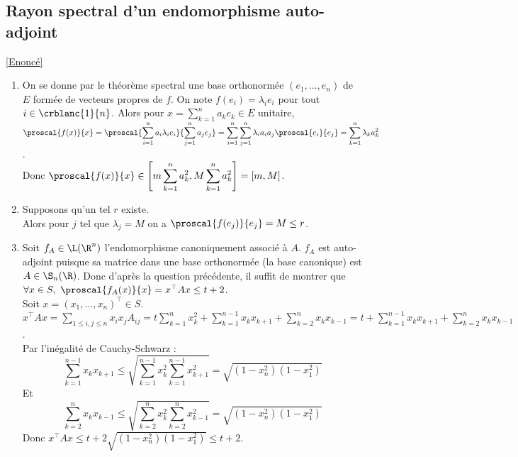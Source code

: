 \documentclass[8pt]{book}
\begin{document}
	\subsection{Rayon spectral d'un endomorphisme auto-adjoint }
	\textcolor{blue}{\hyperref[Rayon spectral d'un endomorphisme auto-adjoint]{[Enoncé]}}\\
	\label{Rayon spectral d'un endomorphisme auto-adjoint corrigé}
	\begin{enumerate}[leftmargin=*]
		\item On se donne par le théorème spectral une base orthonormée $(e_1,\dots,e_n)$ de $E$ formée de vecteurs propres de $f$. On note $f(e_i)=\lambda_ie_i$ pour tout $i\in \crblanc{1}{n}$. Alors pour $x=\displaystyle\sum_{k=1}^na_ke_k\in E$ unitaire,\\
		$\displaystyle\proscal{f(x)}{x}=\proscal{\sum_{i=1}^na_i\lambda_ie_i}{\sum_{j=1}^na_je_j}=\sum_{i=1}^n\sum_{j=1}^n\lambda_ia_ia_j\proscal{e_i}{e_j}=\sum_{k=1}^n\lambda_ka_k^2$.\\
		Donc $\proscal{f(x)}{x}\in \displaystyle\left[m\sum_{k=1}^na_k^2,M\sum_{k=1}^na_k^2\right]=[m,M]$.
		\item Supposons qu'un tel $r$ existe.\\
		Alors pour $j$ tel que $\lambda_j=M$ on a $\proscal{f(e_j)}{e_j}=M\leq r$.
		\item Soit $f_A\in \L(\R^n)$ l'endomorphisme canoniquement associé à $A$. $f_A$ est auto-adjoint puisque sa matrice dans une base orthonormée (la base canonique) est $A\in \S_n(\R)$. Donc d'après la question précédente, il suffit de montrer que $\forall x\in S,\ \proscal{f_A(x)}{x}=x^\top Ax\leq t+2$.\\
		Soit $x=(x_1,\dots,x_n)^\top\in S$.\\
		$x^\top Ax=\displaystyle\sum_{1\leq i,j\leq n}x_ix_jA_{ij}=t\sum_{k=1}^nx_k^2+\sum_{k=1}^{n-1}x_kx_{k+1}+\sum_{k=2}^nx_kx_{k-1}=t+\sum_{k=1}^{n-1}x_kx_{k+1}+\sum_{k=2}^nx_kx_{k-1}$.\\
		Par l'inégalité de Cauchy-Schwarz :
		$$\sum_{k=1}^{n-1}x_kx_{k+1}\leq \sqrt{\sum_{k=1}^{n-1}x_k^2\sum_{k=1}^{n-1}x_{k+1}^2}=\sqrt{(1-x_n^2)(1-x_1^2)}$$
		Et $$\sum_{k=2}^nx_kx_{k-1}\leq \sqrt{\sum_{k=2}^nx_k^2\sum_{k=2}^nx_{k-1}^2}=\sqrt{(1-x_n^2)(1-x_1^2)}$$
		Donc $x^\top Ax\leq t+2\sqrt{(1-x_n^2)(1-x_1^2)}\leq t+2$.
	\end{enumerate}
	
\end{document}

